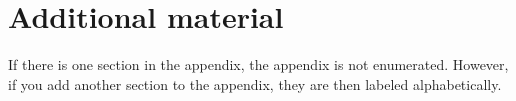 \section{Additional material}
If there is one section in the appendix, the appendix is not enumerated. However, if you add another section to the appendix, they are then labeled alphabetically.